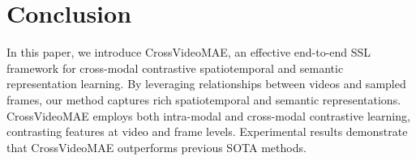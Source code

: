 \section{Conclusion}
\label{sec:conclusion}
In this paper, we introduce CrossVideoMAE, an effective end-to-end SSL framework for cross-modal contrastive spatiotemporal and semantic representation learning. By leveraging relationships between videos and sampled frames, our method captures rich spatiotemporal and semantic representations. CrossVideoMAE employs both intra-modal and cross-modal contrastive learning, contrasting features at video and frame levels. Experimental results demonstrate that CrossVideoMAE outperforms previous SOTA methods.
